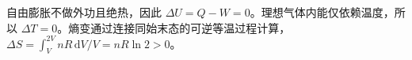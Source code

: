 自由膨胀不做外功且绝热，因此 $\Delta U=Q-W=0$。理想气体内能仅依赖温度，所以 $\Delta T=0$。熵变通过连接同始末态的可逆等温过程计算，$\Delta S=\int_V^{2V}nR\,\mathrm dV/V=nR\ln2>0$。
